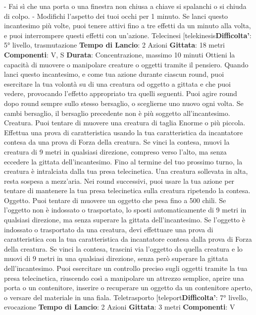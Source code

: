 \begin{multicols}{2}
- Fai sì che una porta o una finestra non chiusa a
chiave si spalanchi o si chiuda di colpo.
- Modifichi l’aspetto dei tuoi occhi per 1 minuto.
Se lanci questo incantesimo più volte, puoi tenere attivi
fino a tre effetti da un minuto alla volta, e puoi
interrompere questi effetti con un’azione.
Telecinesi
[telekinesis\textbf{Difficolta'}:
5° livello, trasmutazione
\textbf{Tempo di Lancio}: 2 Azioni
\textbf{Gittata}: 18 metri
\textbf{Componenti}: V, S
\textbf{Durata}: Concentrazione, massimo 10 minuti
Ottieni la capacità di muovere o manipolare creature o
oggetti tramite il pensiero. Quando lanci questo
incantesimo, e come tua azione durante ciascun round,
puoi esercitare la tua volontà su di una creatura od
oggetto a gittata e che puoi vedere, provocando l’effetto
appropriato tra quelli seguenti. Puoi agire round dopo
round sempre sullo stesso bersaglio, o sceglierne uno
nuovo ogni volta. Se cambi bersaglio, il bersaglio
precedente non è più soggetto all’incantesimo.
Creatura. Puoi tentare di muovere una creatura di
taglia Enorme o più piccola. Effettua una prova di
caratteristica usando la tua caratteristica da incantatore
contesa da una prova di Forza della creatura. Se vinci
la contesa, muovi la creatura di 9 metri in qualsiasi
direzione, compreso verso l’alto, ma senza eccedere la
gittata dell’incantesimo. Fino al termine del tuo
prossimo turno, la creatura è intralciata dalla tua presa
telecinetica. Una creatura sollevata in alta, resta
sospesa a mezz’aria.
Nei round successivi, puoi usare la tua azione per
tentare di mantenere la tua presa telecinetica sulla
creatura ripetendo la contesa.
Oggetto. Puoi tentare di muovere un oggetto che pesa
fino a 500 chili. Se l’oggetto non è indossato o
trasportato, lo sposti automaticamente di 9 metri in
qualsiasi direzione, ma senza superare la gittata
dell’incantesimo.
Se l’oggetto è indossato o trasportato da una creatura,
devi effettuare una prova di caratteristica con la tua
caratteristica da incantatore contesa dalla prova di
Forza della creatura. Se vinci la contesa, trascini via
l’oggetto da quella creatura e lo muovi di 9 metri in una
qualsiasi direzione, senza però superare la gittata
dell’incantesimo.
Puoi esercitare un controllo preciso sugli oggetti tramite
la tua presa telecinetica, riuscendo così a manipolare
un attrezzo semplice, aprire una porta o un contenitore,
inserire o recuperare un oggetto da un contenitore
aperto, o versare del materiale in una fiala.
Teletrasporto
[teleport\textbf{Difficolta'}:
7° livello, evocazione
\textbf{Tempo di Lancio}: 2 Azioni
\textbf{Gittata}: 3 metri
\textbf{Componenti}: V

\end{multicols}
